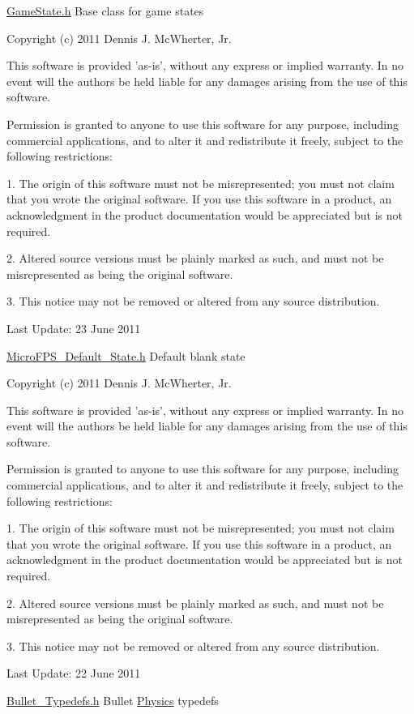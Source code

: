 \hyperlink{_game_state_8h_source}{GameState.h} Base class for game states

Copyright (c) 2011 Dennis J. McWherter, Jr.

This software is provided 'as-\/is', without any express or implied warranty. In no event will the authors be held liable for any damages arising from the use of this software.

Permission is granted to anyone to use this software for any purpose, including commercial applications, and to alter it and redistribute it freely, subject to the following restrictions:

1. The origin of this software must not be misrepresented; you must not claim that you wrote the original software. If you use this software in a product, an acknowledgment in the product documentation would be appreciated but is not required.

2. Altered source versions must be plainly marked as such, and must not be misrepresented as being the original software.

3. This notice may not be removed or altered from any source distribution.

Last Update: 23 June 2011

\hyperlink{_micro_f_p_s___default___state_8h_source}{MicroFPS\_\-Default\_\-State.h} Default blank state

Copyright (c) 2011 Dennis J. McWherter, Jr.

This software is provided 'as-\/is', without any express or implied warranty. In no event will the authors be held liable for any damages arising from the use of this software.

Permission is granted to anyone to use this software for any purpose, including commercial applications, and to alter it and redistribute it freely, subject to the following restrictions:

1. The origin of this software must not be misrepresented; you must not claim that you wrote the original software. If you use this software in a product, an acknowledgment in the product documentation would be appreciated but is not required.

2. Altered source versions must be plainly marked as such, and must not be misrepresented as being the original software.

3. This notice may not be removed or altered from any source distribution.

Last Update: 22 June 2011

\hyperlink{_bullet___typedefs_8h_source}{Bullet\_\-Typedefs.h} Bullet \hyperlink{class_micro_f_p_s_1_1_physics}{Physics} typedefs

